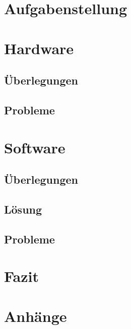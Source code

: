 \section{Aufgabenstellung}


\section{Hardware}
\subsection{Überlegungen}


\subsection{Probleme}


\section{Software}
\subsection{Überlegungen}


\subsection{Lösung}


\subsection{Probleme}


\section{Fazit}


\section{Anhänge}

